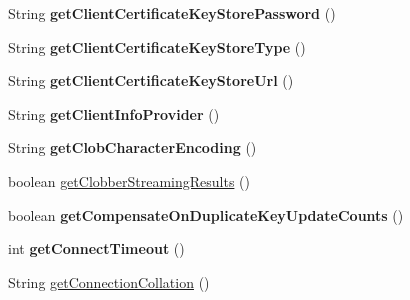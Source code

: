 \begin{DoxyCompactItemize}
\item 
\mbox{\label{classcom_1_1mysql_1_1jdbc_1_1_multi_host_my_s_q_l_connection_a608ababf202324b72a58bf8aefb713b6}} 
String {\bfseries get\+Client\+Certificate\+Key\+Store\+Password} ()
\item 
\mbox{\label{classcom_1_1mysql_1_1jdbc_1_1_multi_host_my_s_q_l_connection_a5480914158bfd36ff4edf04818805dfb}} 
String {\bfseries get\+Client\+Certificate\+Key\+Store\+Type} ()
\item 
\mbox{\label{classcom_1_1mysql_1_1jdbc_1_1_multi_host_my_s_q_l_connection_aef6786d373213b1dd73c404ef3d21d65}} 
String {\bfseries get\+Client\+Certificate\+Key\+Store\+Url} ()
\item 
\mbox{\label{classcom_1_1mysql_1_1jdbc_1_1_multi_host_my_s_q_l_connection_ada02076f04147926e284972f429a74d8}} 
String {\bfseries get\+Client\+Info\+Provider} ()
\item 
\mbox{\label{classcom_1_1mysql_1_1jdbc_1_1_multi_host_my_s_q_l_connection_a12f8c7e19a64d200efc1a5f3a9f1ae99}} 
String {\bfseries get\+Clob\+Character\+Encoding} ()
\item 
boolean \mbox{\hyperlink{classcom_1_1mysql_1_1jdbc_1_1_multi_host_my_s_q_l_connection_afb9da2d46c615f07e7e897ca380f1cf9}{get\+Clobber\+Streaming\+Results}} ()
\item 
\mbox{\label{classcom_1_1mysql_1_1jdbc_1_1_multi_host_my_s_q_l_connection_a3a46fca578c394e11c9f35d6e0760bcd}} 
boolean {\bfseries get\+Compensate\+On\+Duplicate\+Key\+Update\+Counts} ()
\item 
\mbox{\label{classcom_1_1mysql_1_1jdbc_1_1_multi_host_my_s_q_l_connection_aad5ff26b6589b031a1cc8e730eca1c56}} 
int {\bfseries get\+Connect\+Timeout} ()
\item 
String \mbox{\hyperlink{classcom_1_1mysql_1_1jdbc_1_1_multi_host_my_s_q_l_connection_a3cde7bb1197d4ba1f7ed76e515d30d8d}{get\+Connection\+Collation}} ()

\end{DoxyCompactItemize}
